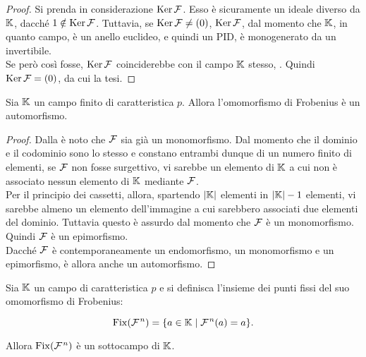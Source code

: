 \documentclass[11pt]{scrbook}
\begin{document}
\begin{proof}
    Si prenda in considerazione $\operatorname{Ker} \mathcal{F}$. Esso è sicuramente
    un ideale diverso da $\mathbb{K}$, dacché $1 \notin \operatorname{Ker} \mathcal{F}$.
    Tuttavia, se $\operatorname{Ker} \mathcal{F} \neq (0)$, $\operatorname{Ker} \mathcal{F}$, dal
    momento che $\mathbb{K}$, in quanto campo, è un anello euclideo,
    e quindi un PID, è monogenerato da un invertibile. \\

    Se però così fosse, $\operatorname{Ker} \mathcal{F}$ coinciderebbe con il
    campo $\mathbb{K}$ stesso, \Lightning{}. Quindi $\operatorname{Ker} \mathcal{F} = (0)$,
    da cui la tesi.
\end{proof}

\begin{proposition}
    Sia $\mathbb{K}$ un campo finito di caratteristica $p$. Allora
    l'omomorfismo di Frobenius è un automorfismo.
\end{proposition}

\begin{proof}
    Dalla  è noto che
    $\mathcal{F}$ sia già un monomorfismo. Dal momento che
    il dominio e il codominio sono lo stesso e constano
    entrambi dunque di un numero finito di elementi,
    se $\mathcal{F}$ non fosse surgettivo, vi sarebbe un elemento
    di $\mathbb{K}$ a cui non è associato nessun elemento di $\mathbb{K}$
    mediante $\mathcal{F}$. \\

    Per il principio dei cassetti, allora, spartendo
    $\left|\mathbb{K}\right|$ elementi in $\left|\mathbb{K}\right|-1$ elementi,
    vi sarebbe almeno un elemento dell'immagine a cui
    sarebbero associati due elementi del dominio. Tuttavia
    questo è assurdo dal momento che $\mathcal{F}$ è un
    monomorfismo. Quindi $\mathcal{F}$ è un epimorfismo. \\

    Dacché $\mathcal{F}$ è contemporaneamente un endomorfismo,
    un monomorfismo e un epimorfismo, è allora anche
    un automorfismo.
\end{proof}

\begin{proposition}
    \label{prop:punti_fissi_frobenius_campo}
    Sia $\mathbb{K}$ un campo di caratteristica $p$ e si
    definisca l'insieme dei punti fissi del suo
    omomorfismo di Frobenius:

    \[ \operatorname{Fix}(\mathcal{F}{\mkern 1.5mu}^n) = \{ a \in \mathbb{K} \mid \mathcal{F}{\mkern 1.5mu}^n(a) = a \} .\]

    \vskip 0.1in

    Allora $\operatorname{Fix}(\mathcal{F}{\mkern 1.5mu}^n)$ è un sottocampo di $\mathbb{K}$.
\end{proposition}
\end{document}
